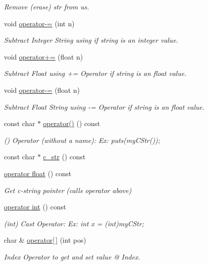 \begin{DoxyCompactItemize}
\begin{DoxyCompactList}\small\item\em Remove (erase) str from us. \end{DoxyCompactList}\item 
void \hyperlink{classstr_a197df4840051ffb56230401a4ab10053}{operator-\/=} (int n)
\begin{DoxyCompactList}\small\item\em Subtract Integer String using if string is an integer value. \end{DoxyCompactList}\item 
void \hyperlink{classstr_a7f9bcfbb170343601835d0f7e626b0ac}{operator+=} (float n)
\begin{DoxyCompactList}\small\item\em Subtract Float using += Operator if string is an float value. \end{DoxyCompactList}\item 
void \hyperlink{classstr_a71248f109c79176b83bc81b53223b72f}{operator-\/=} (float n)
\begin{DoxyCompactList}\small\item\em Subtract Float String using -\/= Operator if string is an float value. \end{DoxyCompactList}\item 
const char $\ast$ \hyperlink{classstr_a9b463b5f9774ba576201d8afa9618663}{operator()} () const 
\begin{DoxyCompactList}\small\item\em () Operator (without a name)\+: Ex\+: puts(my\+C\+Str()); \end{DoxyCompactList}\item 
const char $\ast$ \hyperlink{classstr_a6b85bf260120c1d2b78e7ed0c81df25f}{c\+\_\+str} () const 
\item 
\hyperlink{classstr_a598459fbf321bbe6a3bc04c2db71d49d}{operator float} () const 
\begin{DoxyCompactList}\small\item\em Get c-\/string pointer (calls operator above) \end{DoxyCompactList}\item 
\hyperlink{classstr_af1c1bff1c65968a0a34c26c61cbc3994}{operator int} () const 
\begin{DoxyCompactList}\small\item\em (int) Cast Operator\+: Ex\+: int x = (int)my\+C\+Str; \end{DoxyCompactList}\item 
char \& \hyperlink{classstr_a24b71c212793ade7dea8ce542878f132}{operator\mbox{[}$\,$\mbox{]}} (int pos)
\begin{DoxyCompactList}\small\item\em Index Operator to get and set value @ Index. \end{DoxyCompactList}\end{DoxyCompactItemize}
